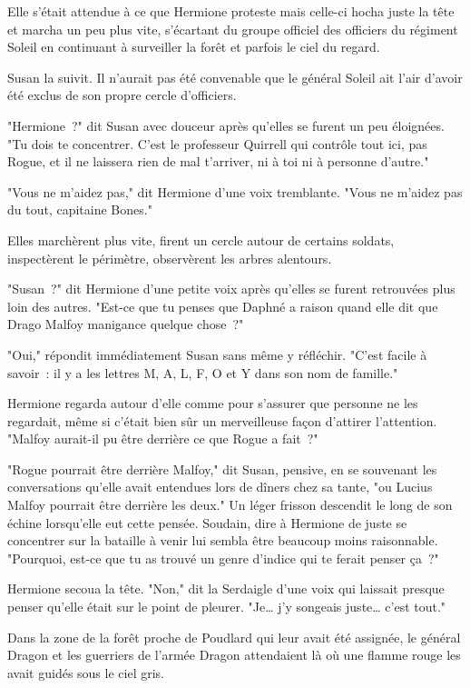 Elle s'était attendue à ce que Hermione proteste mais celle-ci hocha juste la tête et marcha un peu plus vite, s'écartant du groupe officiel des officiers du régiment Soleil en continuant à surveiller la forêt et parfois le ciel du regard.

Susan la suivit. Il n'aurait pas été convenable que le général Soleil ait l'air d'avoir été exclus de son propre cercle d'officiers.

"Hermione~?" dit Susan avec douceur après qu'elles se furent un peu éloignées. "Tu dois te concentrer. C'est le professeur Quirrell qui contrôle tout ici, pas Rogue, et il ne laissera rien de mal t'arriver, ni à toi ni à personne d'autre."

"Vous ne m'aidez pas," dit Hermione d'une voix tremblante. "Vous ne m'aidez pas du tout, capitaine Bones."

Elles marchèrent plus vite, firent un cercle autour de certains soldats, inspectèrent le périmètre, observèrent les arbres alentours.

"Susan~?" dit Hermione d'une petite voix après qu'elles se furent retrouvées plus loin des autres. "Est-ce que tu penses que Daphné a raison quand elle dit que Drago Malfoy manigance quelque chose~?"

"Oui," répondit immédiatement Susan sans même y réfléchir. "C'est facile à savoir~: il y a les lettres M, A, L, F, O et Y dans son nom de famille."

Hermione regarda autour d'elle comme pour s'assurer que personne ne les regardait, même si c'était bien sûr un merveilleuse façon d'attirer l'attention. "Malfoy aurait-il pu être derrière ce que Rogue a fait~?"

"Rogue pourrait être derrière Malfoy," dit Susan, pensive, en se souvenant les conversations qu'elle avait entendues lors de dîners chez sa tante, "ou Lucius Malfoy pourrait être derrière les deux." Un léger frisson descendit le long de son échine lorsqu'elle eut cette pensée. Soudain, dire à Hermione de juste se concentrer sur la bataille à venir lui sembla être beaucoup moins raisonnable. "Pourquoi, est-ce que tu as trouvé un genre d'indice qui te ferait penser ça~?"

Hermione secoua la tête. "Non," dit la Serdaigle d'une voix qui laissait presque penser qu'elle était sur le point de pleurer. "Je… j'y songeais juste… c'est tout."

\later

Dans la zone de la forêt proche de Poudlard qui leur avait été assignée, le général Dragon et les guerriers de l'armée Dragon attendaient là où une flamme rouge les avait guidés sous le ciel gris.

